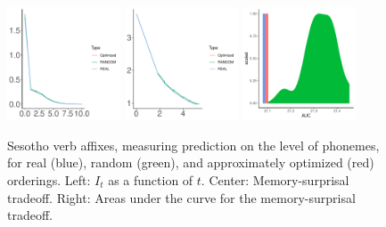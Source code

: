 \documentclass[11pt,letterpaper]{article}
\begin{document}
\begin{figure}
	\begin{center}
\includegraphics[width=0.3\textwidth]{../code/ngram-control/create_models_ngrams/morph/Sesotho/tradeoffs/figures/Sesotho-suffixes-byPhonemes-it.pdf}
\includegraphics[width=0.3\textwidth]{../code/ngram-control/create_models_ngrams/morph/Sesotho/tradeoffs/figures/Sesotho-suffixes-byPhonemes-memsurp.pdf}
\includegraphics[width=0.3\textwidth]{../code/ngram-control/create_models_ngrams/morph/Sesotho/tradeoffs/figures/Sesotho-suffixes-byPhonemes-auc-hist.pdf}
\end{center}
	\caption{Sesotho verb affixes, measuring prediction on the level of phonemes, for real (blue), random (green), and approximately optimized (red) orderings. Left: $I_t$ as a function of $t$. Center: Memory-surprisal tradeoff. Right: Areas under the curve for the memory-surprisal tradeoff.}\label{fig:jap-phon}
\end{figure}
\end{document}
